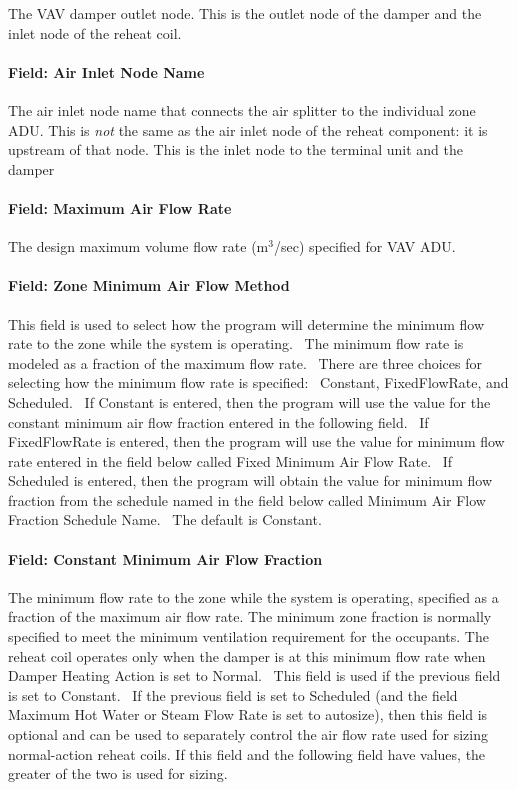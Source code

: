 The VAV damper outlet node. This is the outlet node of the damper and the inlet node of the reheat coil.

\paragraph{Field: Air Inlet Node Name}\label{field-air-inlet-node-name-1}

The air inlet node name that connects the air splitter to the individual zone ADU. This is \emph{not} the same as the air inlet node of the reheat component: it is upstream of that node. This is the inlet node to the terminal unit and the damper

\paragraph{Field: Maximum Air Flow Rate}\label{field-maximum-air-flow-rate-2}

The design maximum volume flow rate (m\(^{3}\)/sec) specified for VAV ADU.

\paragraph{Field: Zone Minimum Air Flow Method}\label{field-zone-minimum-air-flow-method}

This field is used to select how the program will determine the minimum flow rate to the zone while the system is operating.~ The minimum flow rate is modeled as a fraction of the maximum flow rate.~ There are three choices for selecting how the minimum flow rate is specified:~ Constant, FixedFlowRate, and Scheduled.~ If Constant is entered, then the program will use the value for the constant minimum air flow fraction entered in the following field.~ If FixedFlowRate is entered, then the program will use the value for minimum flow rate entered in the field below called Fixed Minimum Air Flow Rate.~ If Scheduled is entered, then the program will obtain the value for minimum flow fraction from the schedule named in the field below called Minimum Air Flow Fraction Schedule Name.~ The default is Constant.

\paragraph{Field: Constant Minimum Air Flow Fraction}\label{field-constant-minimum-air-flow-fraction}

The minimum flow rate to the zone while the system is operating, specified as a fraction of the maximum air flow rate. The minimum zone fraction is normally specified to meet the minimum ventilation requirement for the occupants. The reheat coil operates only when the damper is at this minimum flow rate when Damper Heating Action is set to Normal.~ This field is used if the previous field is set to Constant.~ If the previous field is set to Scheduled (and the field Maximum Hot Water or Steam Flow Rate is set to autosize), then this field is optional and can be used to separately control the air flow rate used for sizing normal-action reheat coils. If this field and the following field have values, the greater of the two is used for sizing.

